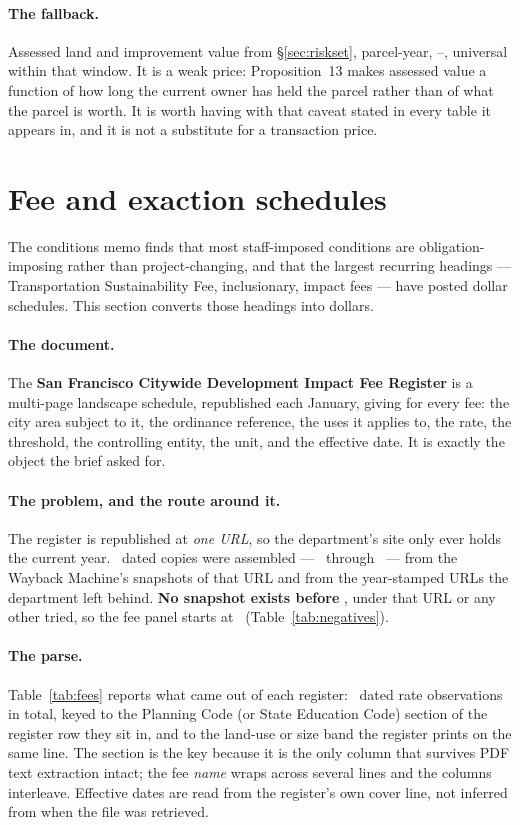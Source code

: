 \documentclass[11pt]{article}
\begin{document}
\paragraph{The fallback.} Assessed land and improvement value from \S\ref{sec:riskset},
parcel-year, \acqAsrFirst--\acqAsrLast, universal within that window. It is a weak price:
Proposition~13 makes assessed value a function of how long the current owner has held the
parcel rather than of what the parcel is worth. It is worth having with that caveat stated in
every table it appears in, and it is not a substitute for a transaction price.

\section{Fee and exaction schedules}
\label{sec:fees}

The conditions memo finds that most staff-imposed conditions are obligation-imposing rather
than project-changing, and that the largest recurring headings --- Transportation Sustainability Fee, inclusionary,
impact fees --- have posted dollar schedules. This section converts those headings into
dollars.

\paragraph{The document.} The \textbf{San Francisco Citywide Development Impact Fee Register}
is a multi-page landscape schedule, republished each January, giving for every fee: the city
area subject to it, the ordinance reference, the uses it applies to, the rate, the threshold,
the controlling entity, the unit, and the effective date. It is exactly the object the brief
asked for.

\paragraph{The problem, and the route around it.} The register is republished at \emph{one
URL}, so the department's site only ever holds the current year. \acqFeeRegisters\ dated
copies were assembled --- \acqFeeFirst\ through \acqFeeLast\ --- from the Wayback Machine's
snapshots of that URL and from the year-stamped URLs the department left behind.
\textbf{No snapshot exists before \acqFeeEarliestSnapshot}, under that URL or any other
tried, so the
fee panel starts at \acqFeeFirst\ (Table~\ref{tab:negatives}).

\paragraph{The parse.} Table~\ref{tab:fees} reports what came out of each register:
\acqFeeRates\ dated rate observations in total, keyed to the Planning Code (or State
Education Code) section of the register row they sit in, and to the land-use or size band the
register prints on the same line. The section is the key because it is the only column that
survives PDF text extraction intact; the fee \emph{name} wraps across several lines and the
columns interleave. Effective dates are read from the register's own cover line, not inferred
from when the file was retrieved.
\end{document}
